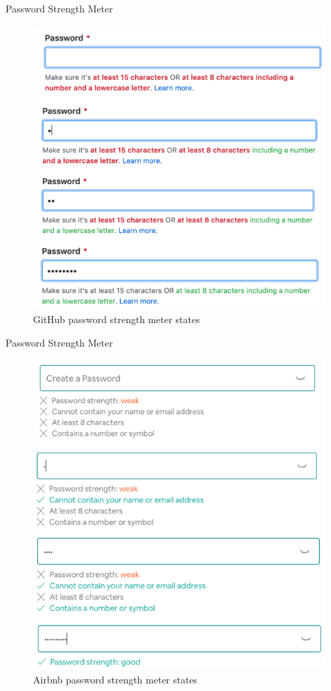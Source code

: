 \documentclass{beamer}
\begin{document}
\begin{frame}[t]{Password Strength Meter}
	\begin{figure}[h]
		\centering
		\includegraphics[scale=0.6]{images/lec08-pic48.png}
		\caption{GitHub password strength meter states}
	\end{figure}
\end{frame}

\begin{frame}[t]{Password Strength Meter}
	\begin{figure}[h]
		\centering
		\includegraphics[scale=0.6]{images/lec08-pic49.png}
		\caption{Airbnb password strength meter states}
	\end{figure}
\end{frame}
\end{document}
